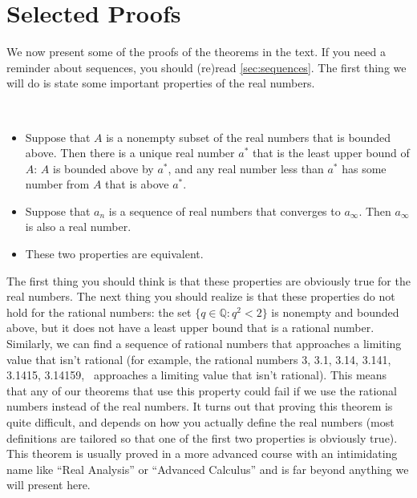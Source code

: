 \chapter{Selected Proofs}

We now present some of the proofs of the theorems in the text.  If you need a reminder about sequences, you should (re)read \autoref{sec:sequences}.  The first thing we will do is state some important properties of the real numbers.

\begin{theorem}\label{thm:realscomplete}%
\hspace{0pt}\\[-5ex]\begin{itemize}
\item Suppose that $A$ is a nonempty subset of the real numbers that is bounded above.  Then there is a unique real number $a^*$ that is the least upper bound of $A$: $A$ is bounded above by $a^*$, and any real number less than $a^*$ has some number from $A$ that is above $a^*$.
\item Suppose that $a_n$ is a sequence of real numbers that converges to $a_\infty$.  Then $a_\infty$ is also a real number.
\item These two properties are equivalent.
\end{itemize}
\end{theorem}

The first thing you should think is that these properties are obviously true for the real numbers.  The next thing you should realize is that these properties do not hold for the rational numbers: the set $\{q\in\mathbb{Q}:q^2<2\}$ is nonempty and bounded above, but it does not have a least upper bound that is a rational number.  Similarly, we can find a sequence of rational numbers that approaches a limiting value that isn't rational (for example, the rational numbers 3, 3.1, 3.14, 3.141, 3.1415, 3.14159, \dotsc\ approaches a limiting value that isn't rational).  This means that any of our theorems that use this property could fail if we use the rational numbers instead of the real numbers.  It turns out that proving this theorem is quite difficult, and depends on how you actually define the real numbers (most definitions are tailored so that one of the first two properties is obviously true).  This theorem is usually proved in a more advanced course with an intimidating name like ``Real Analysis'' or ``Advanced Calculus'' and is far beyond anything we will present here.

